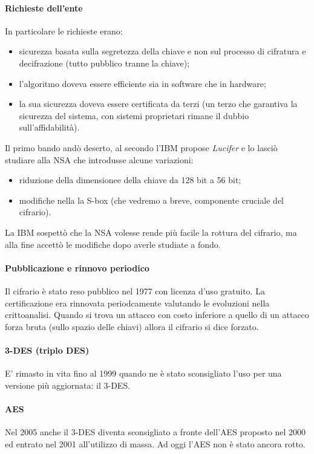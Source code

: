 \paragraph{Richieste dell'ente} In particolare le richieste erano:
\begin{itemize}
    \item sicurezza basata sulla segretezza della chiave e non sul processo di cifratura e decifrazione (tutto pubblico tranne la chiave);
    \item l'algoritmo doveva essere efficiente sia in software che in hardware;
    \item la sua sicurezza doveva essere certificata da terzi (un terzo che garantiva la sicurezza del sistema, con sistemi proprietari rimane il dubbio sull'affidabilità).
\end{itemize}
Il primo bando andò deserto, al secondo l'IBM propose \emph{Lucifer} e lo lasciò studiare alla NSA che introdusse alcune variazioni:
\begin{itemize}
    \item riduzione della dimensionee della chiave da 128 bit a 56 bit;
    \item modifiche nella la S-box (che vedremo a breve, componente cruciale del cifrario).
\end{itemize}
La IBM sospettò che la NSA volesse rende più facile la rottura del cifrario, ma alla fine accettò le modifiche dopo averle studiate a fondo. 
\paragraph{Pubblicazione e rinnovo periodico} Il cifrario è stato reso pubblico nel 1977 con licenza d'uso gratuito. La certificazione era rinnovata periodcamente valutando le evoluzioni nella crittoanalisi. Quando si trova un attacco con costo inferiore a quello di un attacco forza bruta (sullo spazio delle chiavi) allora il cifrario si dice forzato.
\paragraph{3-DES (triplo DES)} E' rimasto in vita fino al 1999 quando ne è stato sconsigliato l'uso per una versione più aggiornata: il 3-DES.
\paragraph{AES} Nel 2005 anche il 3-DES diventa sconsigliato a fronte dell'AES proposto nel 2000 ed entrato nel 2001 all'utilizzo di massa. Ad oggi l'AES non è stato ancora rotto.

